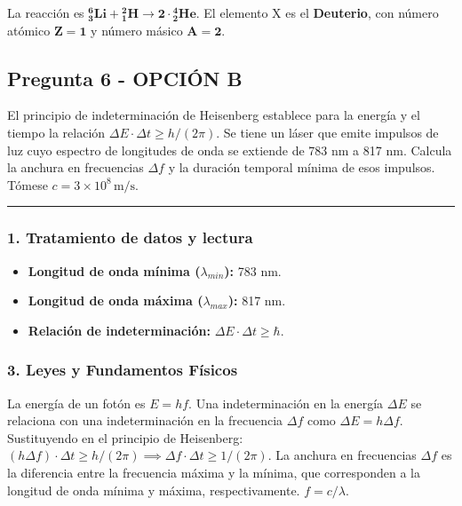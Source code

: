 \begin{cajaresultado}
La reacción es $\boldsymbol{{}^6_3\text{Li} + {}^2_1\text{H} \longrightarrow 2 \cdot {}^4_2\text{He}}$. El elemento X es el \textbf{Deuterio}, con número atómico $\boldsymbol{Z=1}$ y número másico $\boldsymbol{A=2}$.
\end{cajaresultado}

\newpage

\subsection{Pregunta 6 - OPCIÓN B}
\label{subsec:6B_2004_jun_ord}

\begin{cajaenunciado}
El principio de indeterminación de Heisenberg establece para la energía y el tiempo la relación $\Delta E \cdot \Delta t \ge h/(2\pi)$. Se tiene un láser que emite impulsos de luz cuyo espectro de longitudes de onda se extiende de 783 nm a 817 nm. Calcula la anchura en frecuencias $\Delta f$ y la duración temporal mínima de esos impulsos. Tómese $c=3\times10^8\,\text{m/s}$.
\end{cajaenunciado}
\hrule

\subsubsection*{1. Tratamiento de datos y lectura}
\begin{itemize}
    \item \textbf{Longitud de onda mínima ($\lambda_{min}$):} 783 nm.
    \item \textbf{Longitud de onda máxima ($\lambda_{max}$):} 817 nm.
    \item \textbf{Relación de indeterminación:} $\Delta E \cdot \Delta t \ge \hbar$.
\end{itemize}

\subsubsection*{3. Leyes y Fundamentos Físicos}
La energía de un fotón es $E=hf$. Una indeterminación en la energía $\Delta E$ se relaciona con una indeterminación en la frecuencia $\Delta f$ como $\Delta E = h \Delta f$.
Sustituyendo en el principio de Heisenberg: $(h \Delta f) \cdot \Delta t \ge h/(2\pi) \implies \Delta f \cdot \Delta t \ge 1/(2\pi)$.
La anchura en frecuencias $\Delta f$ es la diferencia entre la frecuencia máxima y la mínima, que corresponden a la longitud de onda mínima y máxima, respectivamente. $f=c/\lambda$.

